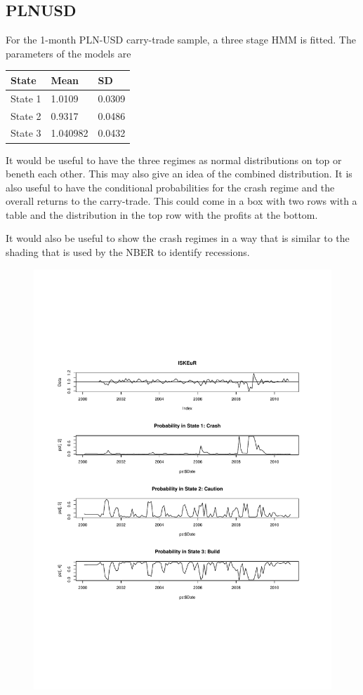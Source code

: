 \documentclass[12pt, a4paper, oneside]{article} %
\begin{document}
\subsection{PLNUSD}
For the 1-month PLN-USD carry-trade sample, a three stage HMM is fitted.  The parameters of the models are 

\begin{tabular}{l | l l}
State & Mean & SD \\
\hline
State 1 & 1.0109 & 0.0309\\
State 2 & 0.9317 & 0.0486\\
State 3 & 1.040982 & 0.0432\\
\end{tabular}

It would be useful to have the three regimes as normal distributions on top or beneth each other. This may also give an idea of the combined distribution.  It is also useful to have the conditional probabilities for the crash regime and the overall returns to the carry-trade.  This could come in a box with two rows with a table and the distribution in the top row with the profits at the bottom. 

It would also be useful to show the crash regimes in a way that is similar to the shading that is used by the NBER to identify recessions.   

 
\begin{figure}
\centering
\includegraphics[scale = .80]{../Figures/ISKEUR.pdf}
\end{figure}
\end{document}
